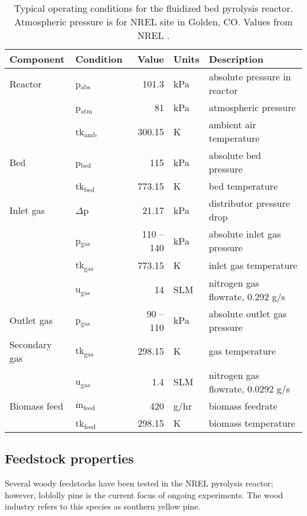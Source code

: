 \begin{table}[H]
    \centering
    \caption{Typical operating conditions for the fluidized bed pyrolysis reactor. Atmospheric pressure is for NREL site in Golden, CO. Values from NREL \cite{French-2019}.}
    \label{tab:operating}
    \begin{tabular}{llrll}
        \toprule
        Component & Condition & Value & Units & Description \\
        \midrule
        Reactor
            & p$_\textrm{abs}$ & 101.3 & kPa & absolute pressure in reactor \\
            & p$_\textrm{atm}$ & 81 & kPa & atmospheric pressure \\
            & tk$_\textrm{amb}$ & 300.15 & K & ambient air temperature \\
        Bed
            & p$_\textrm{bed}$ & 115 & kPa & absolute bed pressure \\
            & tk$_\textrm{bed}$ & 773.15 & K & bed temperature \\
        Inlet gas
            & $\Delta$p & 21.17 & kPa & distributor pressure drop \\
            & p$_\textrm{gas}$ & 110 -- 140 & kPa & absolute inlet gas pressure \\
            & tk$_\textrm{gas}$ & 773.15 & K & inlet gas temperature \\
            & u$_\textrm{gas}$ & 14 & SLM & nitrogen gas flowrate, 0.292 g/s \\
        Outlet gas
            & p$_\textrm{gas}$ & 90 -- 110 & kPa & absolute outlet gas pressure \\
        Secondary gas
            & tk$_\textrm{gas}$ & 298.15 & K & gas temperature \\
            & u$_\textrm{gas}$ & 1.4 & SLM & nitrogen gas flowrate, 0.0292 g/s \\
        Biomass feed
            & $\dot{\textrm{m}}_\textrm{feed}$ & 420 & g/hr & biomass feedrate \\
            & tk$_\textrm{feed}$ & 298.15 & K & biomass temperature \\
        \bottomrule
    \end{tabular}
\end{table}

\subsection{Feedstock properties}

Several woody feedstocks have been tested in the NREL pyrolysis reactor; however, loblolly pine is the current focus of ongoing experiments. The wood industry refers to this species as southern yellow pine.

